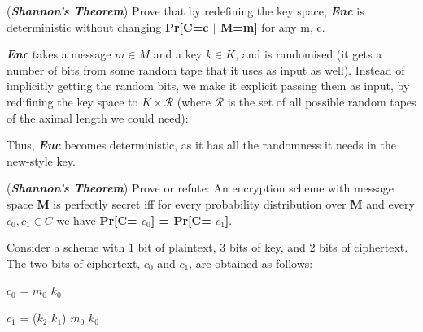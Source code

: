 \documentclass[11pt]{exam}
\begin{document}
\begin{questions}

\question[10] ({\bf \textit{Shannon's Theorem}}) 
Prove that by redefining the key space, \textbf{\textit{Enc}} is deterministic without changing \textbf{Pr[C=c $\mid$ M=m]} for any m, c. 
\begin{solution}
\textbf{\textit{Enc}} takes a message $m \in M$ and a key $k \in K$, and is randomised (it
gets a number of bits from some random tape that it uses as input as well).
Instead of implicitly getting the random bits, we make it explicit passing them
as input, by redifining the key space to $K \times \mathcal{R}$ (where
$\mathcal{R}$ is the set of all possible random tapes of the aximal length we
could need):

Thus, \textbf{\textit{Enc}} becomes deterministic, as it has all the randomness it needs in the
new-style key.
\end{solution}

\question[10] ({\bf \textit{Shannon's Theorem}}) 
Prove or refute: An encryption scheme with message space \textbf{M} is perfectly secret iff for every probability distribution over \textbf{M} and every $c_0, c_1 \in C$  we have \textbf{ Pr[C= \boldmath $c_0$] = Pr[C= $c_1$]}. 

\begin{solution}
  Consider a scheme with $1$ bit of plaintext, $3$ bits of key, and $2$ bits of
  ciphertext. The two bits of ciphertext, $c_0$ and $c_1$, are
  obtained as follows:\par

    $c_0$ = $m_0$ \oplus $k_0$
    \par
    $c_1$ = ($k_2$ \AND $k_1$) \oplus $m_0$ \oplus $k_0$
    

\end{solution}
\end{questions}
\end{document}
